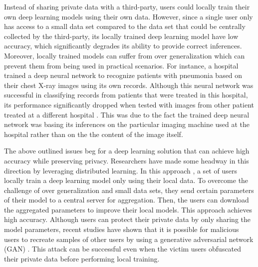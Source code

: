 \documentclass[letterpaper]{article}
\begin{document}
\begin{flushleft}
{Instead of sharing private data with a third-party, users could locally train their own deep learning models using their own
data. However, since a single user only has access to a small data set compared to the data set that could be centrally
collected by the third-party, its locally trained deep learning model have low accuracy, which
significantly degrades its ability to provide correct inferences. 
Moreover, locally trained models can suffer from over generalization which can prevent them from being used in practical scenarios.
For instance, a hospital trained a deep neural network to recognize patients with pneumonia based on their
chest X-ray images using its own records. Although this neural network was successful in classifying records from patients that were
treated in this hospital, its performance significantly dropped when tested with images from other patient treated at a different
hospital \cite{zech2018variable}. This was due to the fact the trained deep neural network was basing its inferences on the
particular imaging machine used at the hospital  rather than on the the content of the image itself.
 
The above outlined issues beg for a deep learning solution that can achieve high accuracy while preserving privacy. 
Researchers have made some headway in this direction by leveraging distributed learning.
In this approach  \cite{shokri2015privacy},  a set of users locally
train a deep learning model only using their local data. To overcome the challenge of over generalization and small
data sets, they send certain parameters of their model to a central server for aggregation. 
Then, the users can download the aggregated parameters to improve their local models. This approach achieves high accuracy.
Although users can protect their private data by only sharing the model parameters, recent studies have
shown that it is possible for malicious users to recreate samples of other users by using a generative
adversarial network (GAN) \cite{hitaj2017deep}. This attack can be successful even when the victim users 
obfuscated their private data before performing  local training. 

}
\end{flushleft}
\end{document}
